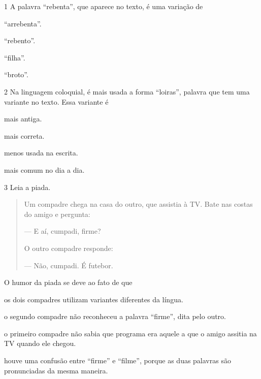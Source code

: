 \num{1} A palavra ``rebenta'', que aparece no texto, é uma variação de

\begin{escolha}
\item ``arrebenta''.

\item ``rebento''.

\item ``filha''.

\item ``broto''.
\end{escolha}

\num{2} Na linguagem coloquial, é mais usada a forma ``loiras'', palavra que tem uma variante no texto. Essa variante é

\begin{escolha}
\item mais antiga.

\item mais correta.

\item menos usada na escrita.

\item mais comum no dia a dia.
\end{escolha}

\num{3} Leia a piada.

\begin{quote}
Um compadre chega na casa do outro, que assistia à TV. Bate nas costas do amigo e pergunta:

--- E aí, cumpadi, firme?

O outro compadre responde:

--- Não, cumpadi. É futebor.

\end{quote}

O humor da piada se deve ao fato de que

\begin{escolha}
\item os dois compadres utilizam variantes diferentes da língua.

\item o segundo compadre não reconheceu a palavra ``firme'', dita pelo outro.

\item o primeiro compadre não sabia que programa era aquele a que o amigo assitia na TV quando ele chegou.

\item houve uma confusão entre ``firme'' e ``filme'', porque as duas palavras são pronunciadas da mesma maneira.
\end{escolha}

